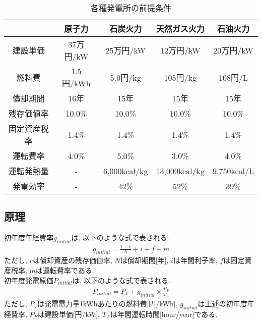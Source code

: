 \documentclass[]{jsarticle}
\begin{document}
    \begin{table}[htb]
      \begin{center}
        \caption{各種発電所の前提条件\cite{t}}
        \begin{tabular}{|c|c|c|c|c|} \hline
              　  & 原子力 & 石炭火力 & 天然ガス火力 & 石油火力 \\ \hline
          建設単価 & 37万円/kW & 25万円/kW & 12万円/kW & 20万円/kW \\ \hline
          燃料費 & 1.5円/kWh & 5.0円/kg & 105円/kg & 108円/L \\ \hline
          償却期間 & 16年 & 15年 & 15年 & 15年 \\ \hline
          残存価値率 & 10.0\% & 10.0\% & 10.0\% & 10.0\% \\ \hline
          固定資産税率 & 1.4\% & 1.4\% & 1.4\% & 1.4\% \\ \hline
          運転費率 & 4.0\% & 5.0\% & 3.0\% & 4.0\% \\ \hline
          運転発熱量 & - & 6,000kcal/kg & 13,000kcal/kg & 9,750kcal/L \\ \hline
          発電効率 & - & 42\% & 52\% & 39\% \\ \hline
        \end{tabular}
        \label{task1}
      \end{center}
    \end{table}



    \subsection{原理\label{pri1}}
        初年度年経費率$g_{initial}$は, 以下のような式で表される.
        \begin{eqnarray}
          \label{g_initial}
          g_{initial} = \frac{1-r}{N} + i + f + m
        \end{eqnarray}
        ただし, $r$は償却資産の残存価値率, $N$は償却期間[年], $i$は年間利子率, $f$は固定資産税率, $m$は運転費率である.\\

        初年度発電原価$P_{initial}$は, 以下のような式で表される.
        \begin{eqnarray}
          P_{initial} = P_V + g_{initial} \times \frac{P_F}{T_A}
        \end{eqnarray}
        ただし, $P_V$は発電電力量1kWhあたりの燃料費[円/kWh], $g_{initial}$は上述の初年度年経費率, $P_F$は建設単価[円/kW], $T_A$は年間運転時間[hour/year]である.\\
\end{document}
